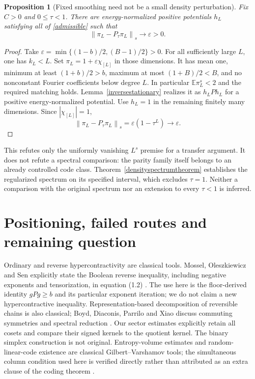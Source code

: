 \documentclass[11pt]{article}
\newcommand{\E}{\mathbb E}
\newcommand{\norm}[1]{\left\|#1\right\|}
\newtheorem{proposition}[theorem]{Proposition}
\begin{document}
\begin{proposition}[Fixed smoothing need not be a small density perturbation]\label{densityperturbationfailure}
Fix $C>0$ and $0\leq\tau<1$. There are energy-normalized positive
potentials $h_L$ satisfying all of \eqref{admissible} such that
\[
 \norm{\pi_L-P_\tau\pi_L}_s\longrightarrow\varepsilon>0.
\]
\end{proposition}
\begin{proof}
Take $\varepsilon=\min\{(1-b)/2,(B-1)/2\}>0$. For all sufficiently
large $L$, one has $k_L<L$. Set $\pi_L=1+\varepsilon\chi_{[L]}$ in
those dimensions. It has mean one, minimum at least $(1+b)/2>b$,
maximum at most $(1+B)/2<B$, and no nonconstant Fourier coefficients
below degree $L$. In particular $\E\pi_L^s<2$ and the required matching
holds. Lemma~\ref{inversestationary} realizes it as $h_LPh_L$ for a
positive energy-normalized potential. Use $h_L=1$ in the remaining
finitely many dimensions. Since $|\chi_{[L]}|=1$,
\[
 \norm{\pi_L-P_\tau\pi_L}_s
       =\varepsilon(1-\tau^L)\longrightarrow\varepsilon.
\]
\end{proof}
This refutes only the uniformly vanishing $L^s$ premise for a transfer
argument. It does not refute a spectral comparison: the parity family
itself belongs to an already controlled code class. Theorem~\ref{densityspectrumtheorem}
establishes the regularized spectrum on its specified interval, which
excludes $\tau=1$. Neither a comparison with the original spectrum nor
an extension to every $\tau<1$ is inferred.

\section{Positioning, failed routes and remaining question}
Ordinary and reverse hypercontractivity are classical tools. Mossel, Oleszkiewicz and Sen explicitly state the Boolean reverse inequality, including negative exponents and tensorization, in equation (1.2) \cite{mos}. The use here is the floor-derived identity $gPg\geq b$ and its particular exponent iteration; we do not claim a new hypercontractive inequality. Representation-based decomposition of reversible chains is also classical; Boyd, Diaconis, Parrilo and Xiao discuss commuting symmetries and spectral reduction \cite{boyd}. Our sector estimates explicitly retain all cosets and compare their signed kernels to the quotient kernel. The binary simplex construction is not original. Entropy-volume estimates and random-linear-code existence are classical Gilbert--Varshamov tools; the simultaneous column condition used here is verified directly rather than attributed as an extra clause of the coding theorem \cite{guruswami}.
\end{document}
